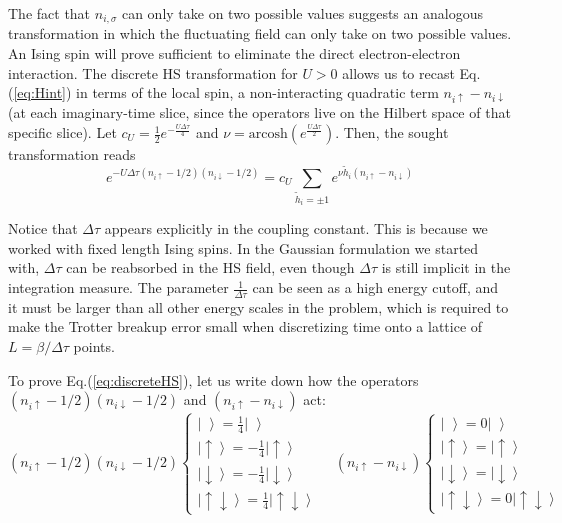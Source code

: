 The fact that $n_{i,\sigma}$ can only take on two possible values suggests an analogous transformation in which the fluctuating field can only take on two possible values.
An Ising spin will prove sufficient to eliminate the direct electron-electron interaction.
The discrete HS transformation for $U > 0$ allows us to recast Eq.(\ref{eq:Hint}) in terms of the local spin, a non-interacting quadratic term $n_{i\uparrow} - n_{i\downarrow} $ (at each imaginary-time slice, since the operators live on the Hilbert space of that specific slice).
Let $c_U = \frac{1}{2} e^{-\frac{U\Delta \tau}{4}}$ and $\nu = \text{arcosh} ( e^{\frac{U\Delta\tau}{2}})$.
Then, the sought transformation reads
\begin{equation}\label{eq:discreteHS}
e^{-U \Delta\tau (n_{i\uparrow} - 1/2 ) (n_{i\downarrow} - 1/2 )} = c_U \sum_{\widetilde{h}_i = \pm 1} e^{\nu \widetilde{h}_i (n_{i\uparrow} - n_{i\downarrow} )}
\end{equation}

Notice that $\Delta \tau$ appears explicitly in the coupling constant.
This is because we worked with fixed length Ising spins.
In the Gaussian formulation we started with, $\Delta \tau$ can be reabsorbed in the HS field, even though $\Delta \tau$ is still implicit in the integration measure.
The parameter $\frac{1}{\Delta \tau}$ can be seen as a high energy cutoff, and it must be larger than all other energy scales in the problem, which is required to make the Trotter breakup error small when discretizing time onto 	a lattice of $L = \beta / \Delta \tau$ points.

To prove Eq.(\ref{eq:discreteHS}), let us write down how the operators  $(n_{i\uparrow} - 1/2 ) (n_{i\downarrow} - 1/2 )$ and $(n_{i\uparrow} - n_{i\downarrow} )$ act:
\begin{equation}
(n_{i\uparrow} - 1/2 ) (n_{i\downarrow} - 1/2 )
\begin{cases}
\left| \, \, \right\rangle = \frac{1}{4} \left| \, \, \right\rangle \\
\left| \uparrow \right\rangle = -\frac{1}{4} \left| \uparrow \right\rangle \\
\left| \downarrow \right\rangle = -\frac{1}{4} \left| \downarrow \right\rangle \\
\left| \uparrow \downarrow \right\rangle = \frac{1}{4} \left| \uparrow \downarrow \right\rangle
\end{cases} \quad
(n_{i\uparrow} - n_{i\downarrow} )
\begin{cases}
\left| \, \, \right\rangle = 0\left| \, \, \right\rangle \\
\left| \uparrow \right\rangle = \left| \uparrow \right\rangle \\
\left| \downarrow \right\rangle = \left| \downarrow \right\rangle \\
\left| \uparrow \downarrow \right\rangle = 0 \left| \uparrow \downarrow \right\rangle
\end{cases}
\end{equation}

